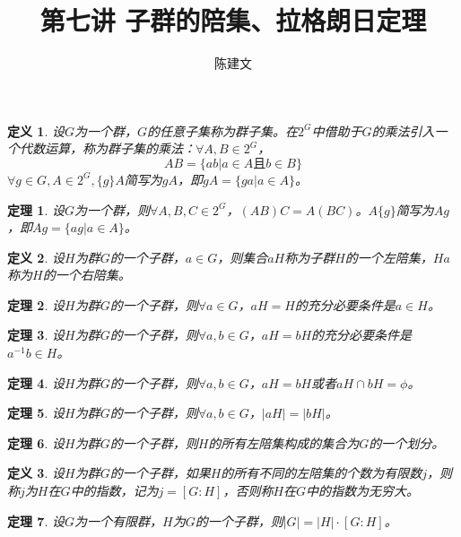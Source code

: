 \documentclass{article}
\newtheorem{Def}{定义}
\newtheorem{Thm}{定理}
\begin{document}
\begin{CJK*}{UTF8}{gbsn}
  \title{第七讲 子群的陪集、拉格朗日定理}
  \author{陈建文}
  \maketitle
  \begin{Def}
    设$G$为一个群，$G$的任意子集称为群子集。在$2^G$中借助于$G$的乘法引入一个代数运算，称为群子集的乘法：$\forall A,B\in 2^G$，
    \[AB=\{ab|a\in A \text{且} b\in B\}\]
    $\forall g\in G,A\in 2^G,\{g\}A$简写为$gA$，即$gA=\{ga|a\in A\}$。
  \end{Def}
  \begin{Thm}
    设$G$为一个群，则$\forall A,B,C\in 2^G$，$(AB)C=A(BC)$。$A\{g\}$简写为$Ag$，即$Ag=\{ag|a\in A\}$。
  \end{Thm}
\begin{Def}
  设$H$为群$G$的一个子群，$a\in G$，则集合$aH$称为子群$H$的一个左陪集，$Ha$称为$H$的一个右陪集。
\end{Def}

\begin{Thm}
  设$H$为群$G$的一个子群，则$\forall a\in G$，$aH=H$的充分必要条件是$a\in H$。
\end{Thm}
  
\begin{Thm}
  设$H$为群$G$的一个子群，则$\forall a,b\in G$，$aH=bH$的充分必要条件是$a^{-1}b\in H$。
\end{Thm}

\begin{Thm}
  设$H$为群$G$的一个子群，则$\forall a,b\in G$，$aH=bH$或者$aH\cap bH=\phi$。
\end{Thm}

\begin{Thm}
  设$H$为群$G$的一个子群，则$\forall a,b\in G$，$|aH|=|bH|$。
\end{Thm}

\begin{Thm}
  设$H$为群$G$的一个子群，则$H$的所有左陪集构成的集合为$G$的一个划分。
\end{Thm}

\begin{Def}
  设$H$为群$G$的一个子群，如果$H$的所有不同的左陪集的个数为有限数$j$，则称$j$为$H$在$G$中的指数，记为$j=[G:H]$，否则称$H$在$G$中的指数为无穷大。
\end{Def}

\begin{Thm}
 设$G$为一个有限群，$H$为$G$的一个子群，则$|G|=|H|\cdot [G:H]$。 
\end{Thm}


\end{CJK*}
\end{document}
